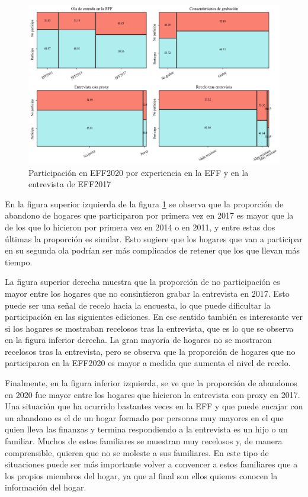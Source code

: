 \begin{figure}[ht]
	\centering
	\includegraphics[width=1\textwidth]{figs/figure1.png}
	\caption{Participación en EFF2020 por experiencia en la EFF y en la entrevista de EFF2017}
	\label{fig:fig1}
\end{figure}

En la figura superior izquierda de la figura \ref{fig:fig1} se observa que la proporción de abandono de hogares que participaron por primera vez en 2017 es mayor que la de los que lo hicieron por primera vez en 2014 o en 2011, y entre estas dos últimas la proporción es similar. Esto sugiere que los hogares que van a participar en su segunda ola podrían ser más complicados de retener que los que llevan más tiempo. 

La figura superior derecha muestra que la proporción de no participación es mayor entre los hogares que no consintieron grabar la entrevista en 2017. Esto puede ser una señal de recelo hacia la encuesta, lo que puede dificultar la participación en las siguientes ediciones. En ese sentido también es interesante ver si los hogares se mostraban recelosos tras la entrevista, que es lo que se observa en la figura inferior derecha. La gran mayoría de hogares no se mostraron recelosos tras la entrevista, pero se observa que la proporción de hogares que no participaron en la EFF2020 es mayor a medida que aumenta el nivel de recelo.

Finalmente, en la figura inferior izquierda, se ve que la proporción de abandonos en 2020 fue mayor entre los hogares que hicieron la entrevista con proxy en 2017. Una situación que ha ocurrido bastantes veces en la EFF y que puede encajar con un abandono es el de un hogar formado por personas muy mayores en el que quien lleva las finanzas y termina respondiendo a la entrevista es un hijo o un familiar. Muchos de estos familiares se muestran muy recelosos y, de manera comprensible, quieren que no se moleste a sus familiares. En este tipo de situaciones puede ser más importante volver a convencer a estos familiares que a los propios miembros del hogar, ya que al final son ellos quienes conocen la información del hogar.


